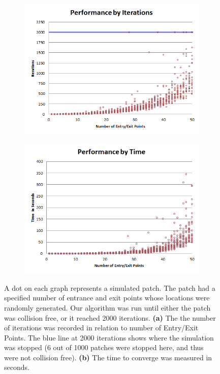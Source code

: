 \begin{figure}[t]
 \centering
%
\begin{subfigure}[b]{0.48\linewidth}
 \centering
	\includegraphics[width=\linewidth]{images/res-iter-graph.png}
	\caption{}
 \end{subfigure}
%
\begin{subfigure}[b]{0.48\linewidth}
 \centering
	\includegraphics[width=\linewidth]{images/res-time-graph.png}
	\caption{}
 \end{subfigure}
% 
\caption{ A dot on each graph represents a simulated patch. The patch had a specified number of entrance and exit points whose locations were randomly generated. Our algorithm was run until either the patch was collision free, or it reached 2000 iterations.  \textbf{(a)} The the number of iterations was recorded in relation to number of Entry/Exit Points. The blue line at 2000 iterations shows where the simulation was stopped (6 out of 1000 patches were stopped here, and thus were not collision free). \textbf{(b)} The time to converge was measured in seconds.
}
\end{figure}
